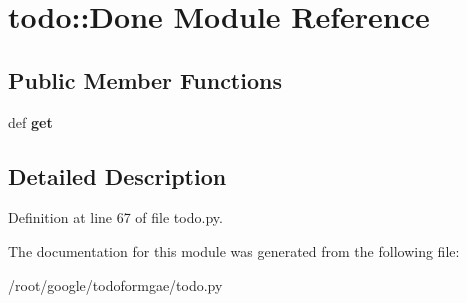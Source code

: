 \hypertarget{moduletodo_1_1_done}{
\section{todo::Done Module Reference}
\label{moduletodo_1_1_done}
}
\subsection*{Public Member Functions}
\begin{DoxyCompactItemize}
\item 
\hypertarget{moduletodo_1_1_done_ab9f820b36cf5b01646d8cd411385e6bd}{
def {\bfseries get}}
\label{moduletodo_1_1_done_ab9f820b36cf5b01646d8cd411385e6bd}

\end{DoxyCompactItemize}


\subsection{Detailed Description}


Definition at line 67 of file todo.py.

The documentation for this module was generated from the following file:\begin{DoxyCompactItemize}
\item 
/root/google/todoformgae/todo.py\end{DoxyCompactItemize}
